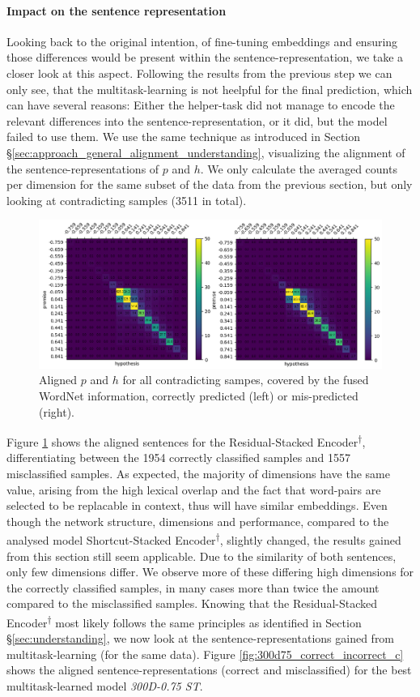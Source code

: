 \paragraph*{Impact on the sentence representation}
Looking back to the original intention, of fine-tuning embeddings and ensuring those differences would be present within the sentence-representation, we take a closer look at this aspect. Following the results from the previous step we can only see, that the multitask-learning is not heelpful for the final prediction, which can have several reasons: Either the helper-task did not manage to encode the relevant differences into the sentence-representation, or it did, but the model failed to use them. We use the same technique as introduced in Section §\ref{sec:approach_general_alignment_understanding}, visualizing the alignment of the sentence-representations of $p$ and $h$. We only calculate the averaged counts per dimension for the same subset of the data from the previous section, but only looking at contradicting samples (3511 in total).
\begin{figure}[tph!]
\centering
	\includegraphics[totalheight=7cm]{fig/base_correct_incorrect_c.png}
	\caption{Aligned $p$ and $h$ for all contradicting sampes, covered by the fused WordNet information, correctly predicted (left) or mis-predicted (right).}
	\label{fig:base_correct_incorrect_c}
\end{figure}
Figure \ref{fig:base_correct_incorrect_c} shows the aligned sentences for the Residual-Stacked Encoder\textsuperscript{$\dagger$}, differentiating between the 1954 correctly classified samples and 1557 misclassified samples. As expected, the majority of dimensions have the same value, arising from the high lexical overlap and the fact that word-pairs are selected to be replacable in context, thus will have similar embeddings. Even though the network structure, dimensions and performance, compared to the analysed model Shortcut-Stacked Encoder\textsuperscript{$\dagger$}, slightly changed, the results gained from this section still seem applicable. Due to the similarity of both sentences, only few dimensions differ. We observe more of these differing high dimensions for the correctly classified samples, in many cases more than twice the amount compared to the misclassified samples. Knowing that the Residual-Stacked Encoder\textsuperscript{$\dagger$} most likely follows the same principles as identified in Section §\ref{sec:understanding}, we now look at the sentence-representations gained from multitask-learning (for the same data). Figure \ref{fig:300d75_correct_incorrect_c} shows the aligned sentence-representations (correct and misclassified) for the best multitask-learned model \textit{300D-0.75 ST}.
